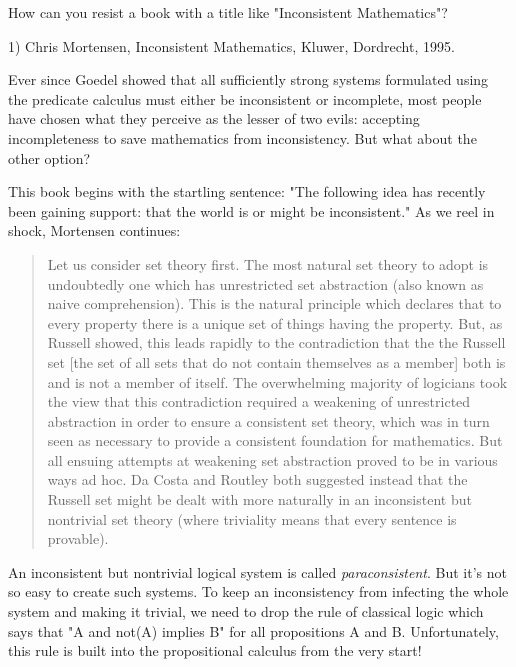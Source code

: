 


How can you resist a book with a 
title like "Inconsistent Mathematics"?

1) Chris Mortensen, Inconsistent Mathematics, Kluwer, Dordrecht, 1995.

Ever since Goedel showed that all sufficiently strong systems formulated
using the predicate calculus must either be inconsistent or incomplete,
most people have chosen what they perceive as the lesser of two evils:
accepting incompleteness to save mathematics from inconsistency.  But
what about the other option?  

This book begins with the startling sentence: "The following idea
has recently been gaining support: that the world is or might be
inconsistent." As we reel in shock, Mortensen continues:

\begin{quote}
     Let us consider set theory first.  The most natural set theory to
     adopt is undoubtedly one which has unrestricted set abstraction
     (also known as naive comprehension).  This is the natural principle
     which declares that to every property there is a unique set of
     things having the property. But, as Russell showed, this leads
     rapidly to the contradiction that the the Russell set [the set of
     all sets that do not contain themselves as a member] both is and is
     not a member of itself.  The overwhelming  majority of logicians
     took the view that this contradiction required a weakening of
     unrestricted abstraction in order to ensure a consistent set
     theory, which was in turn seen as necessary to provide a consistent
     foundation for mathematics.  But all ensuing attempts at weakening
     set abstraction proved to be in various ways ad hoc.  Da Costa and
     Routley both suggested instead that the Russell set might be dealt
     with more naturally in an inconsistent but nontrivial set theory
     (where triviality means that every sentence is provable). 
\end{quote}
    
An inconsistent but nontrivial logical system is called 
\emph{paraconsistent}.  
But it's not so easy to create such systems.  To keep an inconsistency
from infecting the whole system and making it trivial, we need to drop
the rule of classical logic which says that "A and not(A) implies B"
for all propositions A and B.  Unfortunately, this rule is built into the 
propositional calculus from the very start!  

